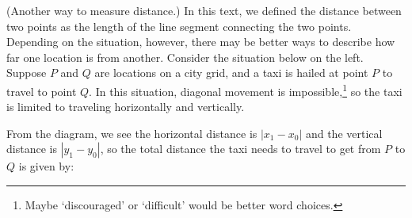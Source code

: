 \documentclass{ximera}
\begin{document}
\begin{problem}\label{taxidistance}
(Another way to measure distance.) In this text, we defined the distance between two points as the length of the line segment connecting the two points.  Depending on the situation, however, there may be better ways to describe how far one location is from another.  Consider the situation below on the left.  Suppose $P$ and $Q$ are locations on a city grid, and a taxi is hailed at point $P$ to travel to point $Q$.  In this situation, diagonal movement is impossible,\footnote{Maybe `discouraged' or `difficult' would be better word choices.} so the taxi is limited to traveling horizontally and vertically. 

\begin{center}
\end{center}


From the diagram, we see the horizontal distance  is $\left|x_1 - x_0\right|$ and the vertical distance is $\left|y_1 - y_0\right|$, so the total distance the taxi needs to travel to get from $P$ to $Q$ is given by:


\end{problem}
\end{document}
